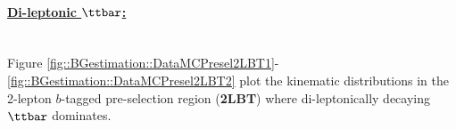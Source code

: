 



\clearpage
\paragraph{\underline{Di-leptonic $\ttbar$:}} \mbox{} \\
Figure \ref{fig::BGestimation::DataMCPresel2LBT1}-\ref{fig::BGestimation::DataMCPresel2LBT2} plot the kinematic distributions in the 2-lepton $b$-tagged pre-selection region (\textbf{2LBT}) where di-leptonically decaying $\ttbar$ dominates. \\


%
\clearpage

